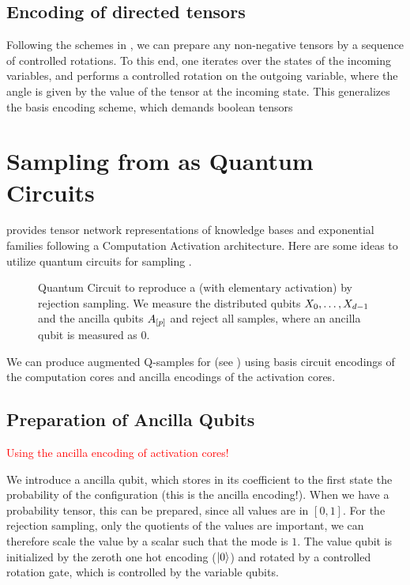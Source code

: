 \documentclass[aps,onecolumn,nofootinbib,pra]{article}
\newcommand{\red}[1]{\textcolor{red}{#1}}
\begin{document}
    \subsection{Encoding of directed tensors}

    Following the schemes in \cite{low_quantum_2014}, we can prepare any non-negative tensors by a sequence of controlled rotations.
    To this end, one iterates over the states of the incoming variables, and performs a controlled rotation on the outgoing variable, where the angle is given by the value of the tensor at the incoming state.
    This generalizes the basis encoding scheme, which demands boolean tensors



    \section{Sampling from \ComputationActivationNetworks{} as Quantum Circuits}

    \tnreason{} provides tensor network representations of knowledge bases and exponential families following a Computation Activation architecture.
    Here are some ideas to utilize quantum circuits for sampling \ComputationActivationNetworks{}.

    \begin{figure}
        \begin{center}
            
        \end{center}
        \caption{
            Quantum Circuit to reproduce a \ComputationActivationNetwork{} (with elementary activation) by rejection sampling.
            We measure the distributed qubits $X_{0},\ldots,X_{d-1}$ and the ancilla qubits $A_{[p]}$ and reject all samples, where an ancilla qubit is measured as $0$.
        }
    \end{figure}

    We can produce augmented Q-samples for \ComputationActivationNetworks{} (see ) using basis circuit encodings of the computation cores and ancilla encodings of the activation cores.

    \subsection{Preparation of Ancilla Qubits}

    \red{Using the ancilla encoding of activation cores!}

    We introduce a ancilla qubit, which stores in its coefficient to the first state the probability of the configuration (this is the ancilla encoding!).
    When we have a probability tensor, this can be prepared, since all values are in $[0,1]$.
    For the rejection sampling, only the quotients of the values are important, we can therefore scale the value by a scalar such that the mode is $1$.
    The value qubit is initialized by the zeroth one hot encoding ($\ket{0}$) and rotated by a controlled rotation gate, which is controlled by the variable qubits.
\end{document}
